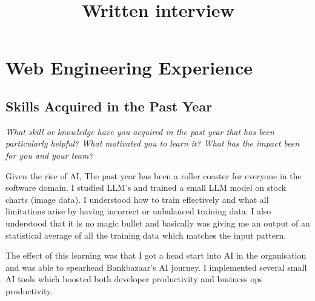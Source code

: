 \documentclass{article}
\title{Written interview}
\begin{document}
\maketitle

\section{Web Engineering Experience}

\subsection{Skills Acquired in the Past Year}
\small \textit{What skill or knowledge have you acquired in the past year that has been particularly helpful? What motivated you to learn it? What has the impact been for you and your team?} 
\normalsize 


Given the rise of AI, The past year has been a roller coaster for everyone in the software domain. I studied LLM's and trained a small LLM model 
on stock charts (image data). I understood how to train effectively and what all limitations arise by having incorrect or unbalanced 
training data. I also understood that it is no magic bullet and basically was giving me an output of an statistical average of all 
the training data which matches the input pattern. 

The effect of this learning was that I got a head start into AI in the organisation and was able to spearhead Bankbazaar's AI 
journey. I implemented several small AI tools which boosted both developer productivity and business ops productivity.
\end{document}
